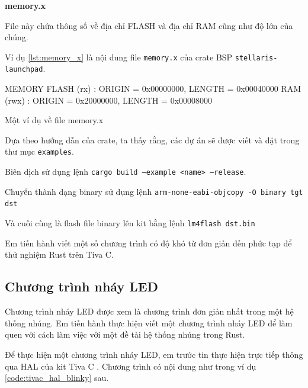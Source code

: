 \textbf{memory.x}

File này chứa thông số về địa chỉ FLASH và địa chỉ RAM cũng như độ lớn của chúng.

Ví dụ \ref{lst:memory_x} là nội dung file \texttt{memory.x} của crate BSP \texttt{stellaris-launchpad}.

\begin{listing}[ht]
\begin{plaintext}
MEMORY
{
    FLASH (rx) : ORIGIN = 0x00000000, LENGTH = 0x00040000
    RAM (rwx) : ORIGIN = 0x20000000, LENGTH = 0x00008000
}
\end{plaintext}
\caption{Một ví dụ về file memory.x}
\label{lst:memory_x}
\end{listing}

Dựa theo hướng dẫn của crate, ta thấy rằng, các dự án sẽ được viết và đặt trong thư mục \texttt{examples}.

Biên dịch sử dụng lệnh \texttt{cargo build --example <name> --release}.

Chuyển thành dạng binary sử dụng lệnh \texttt{arm-none-eabi-objcopy -O binary tgt dst}

Và cuối cùng là flash file binary lên kit bằng lệnh \texttt{lm4flash dst.bin}

Em tiến hành viết một số chương trình có độ khó từ đơn giản đến phức tạp để thử nghiệm Rust trên Tiva C.

\subsection{Chương trình nháy LED}\label{lbl:rust_blinky}
Chương trình nháy LED được xem là chương trình đơn giản nhất trong một hệ thống nhúng.
Em tiến hành thực hiện viết một chương trình nháy LED để làm quen với cách làm việc với một đề tài hệ thống nhúng trong Rust.

Để thực hiện một chương trình nháy LED, em trước tin thực hiện trực tiếp thông qua HAL của kit Tiva C \cite{tm4c_hal}.
Chương trình có nội dung như trong ví dụ \ref{code:tivac_hal_blinky} sau.

